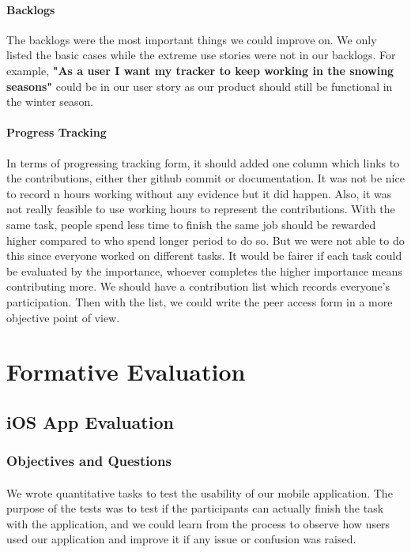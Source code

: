 \documentclass[12pt,a4paper]{article}
\begin{document}
        \paragraph{Backlogs} The backlogs were the most important things we could improve on. We only listed the basic cases while the extreme use stories were not in our backlogs. For example, {\bf "As a user I want my tracker to keep working in the snowing seasons"} could be in our user story as our product should still be functional in the winter season.

        \paragraph{Progress Tracking} In terms of progressing tracking form, it should added one column which links to the contributions, either ther github commit or documentation. It was not be nice to record n hours working without any evidence but it did happen. Also, it was not really feasible to use working hours to represent the contributions. With the same task, people spend less time to finish the same job should be rewarded higher compared to who spend longer period to do so. But we were not able to do this since everyone worked on different tasks. It would be fairer if each task could be evaluated by the importance, whoever completes the higher importance means contributing more. We should have a contribution list which records everyone's participation. Then with the list, we could write the peer access form in a more objective point of view.

    \section{Formative Evaluation}
      \label{Chapter:Formative Evaluation}
      \subsection{iOS App Evaluation} 
        
        \subsubsection{Objectives and Questions}
          \paragraph{}
            We wrote quantitative tasks to test the usability of our mobile application\cite{WritingTasks}. The purpose of the tests was to test if the participants can actually finish the task with the application, and we could learn from the process to observe how users used our application and improve it if any issue or confusion was raised. 
\end{document}
